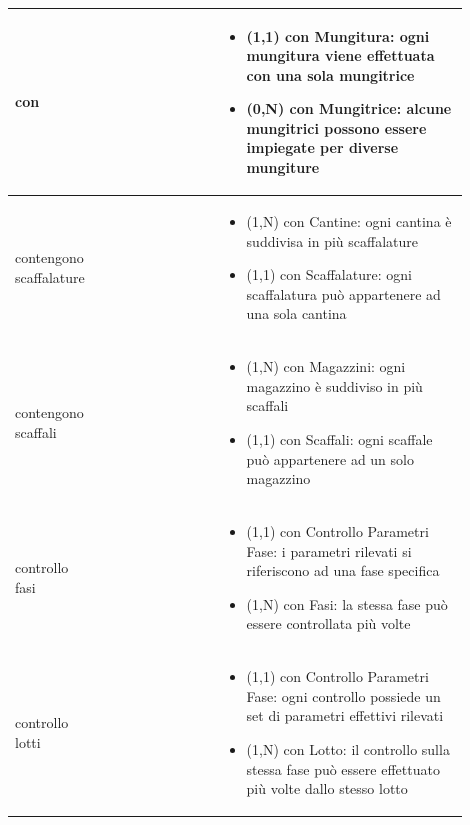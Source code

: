 \documentclass[12pt,a4paper]{article}
\begin{document}
\begin{center}
\begin{longtable}{|p{0.16\linewidth}|p{0.24\linewidth}|p{0.50\linewidth}|}
\hline
con 				&   
					& \begin{itemize}
						\setlength{\itemindent}{-1em}
						\vspace{-25pt}
						\setlength\itemsep{-0.25em}
						\item (1,1) con Mungitura: ogni mungitura viene effettuata con una sola mungitrice
						\item (0,N) con Mungitrice: alcune mungitrici possono essere impiegate per diverse mungiture
					\end{itemize}\\ 

\hline
contengono scaffalature 				&   
					& \begin{itemize}
						\setlength{\itemindent}{-1em}
						\vspace{-25pt}
						\setlength\itemsep{-0.25em}
						\item (1,N) con Cantine: ogni cantina è suddivisa in più scaffalature
						\item (1,1) con Scaffalature: ogni scaffalatura può appartenere ad una sola cantina					\end{itemize}\\ 

\hline
contengono scaffali 				&   
					& \begin{itemize}
						\setlength{\itemindent}{-1em}
						\vspace{-25pt}
						\setlength\itemsep{-0.25em}
						\item (1,N) con Magazzini: ogni magazzino è suddiviso in più scaffali
						\item (1,1) con Scaffali: ogni scaffale può appartenere ad un solo magazzino
					\end{itemize}\\ 

\hline
controllo fasi 				&  
					& \begin{itemize}
						\setlength{\itemindent}{-1em}
						\vspace{-25pt}
						\setlength\itemsep{-0.25em}
						\item (1,1) con Controllo Parametri Fase: i parametri rilevati si riferiscono ad una fase specifica
						\item (1,N) con Fasi: la stessa fase può essere controllata più volte
					\end{itemize}\\ 

\hline
controllo lotti 				&  
					& \begin{itemize}
						\setlength{\itemindent}{-1em}
						\vspace{-25pt}
						\setlength\itemsep{-0.25em}
						\item (1,1) con Controllo Parametri Fase: ogni controllo possiede un set di parametri effettivi rilevati
						\item (1,N) con Lotto: il controllo sulla stessa fase può essere effettuato più volte dallo stesso lotto
					\end{itemize}\\ 


\end{longtable}
\end{center}
\end{document}
